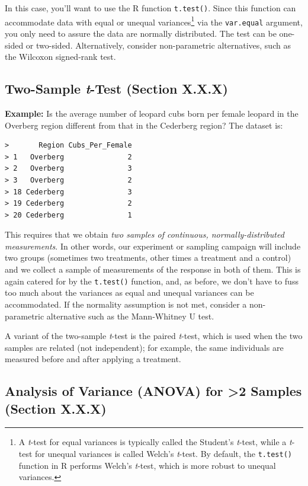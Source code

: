 \documentclass[
  letterpaper,
]{book}
\begin{document}
In this case, you'll want to use the R function \texttt{t.test()}. Since
this function can accommodate data with equal or unequal
variances\footnote{A \emph{t}-test for equal variances is typically
  called the Student's \emph{t}-test, while a \emph{t}-test for unequal
  variances is called Welch's \emph{t}-test. By default, the
  \texttt{t.test()} function in R performs Welch's \emph{t}-test, which
  is more robust to unequal variances.} via the \texttt{var.equal}
argument, you only need to assure the data are normally distributed. The
test can be one-sided or two-sided. Alternatively, consider
non-parametric alternatives, such as the Wilcoxon signed-rank test.

\subsection{\texorpdfstring{Two-Sample \emph{t}-Test (Section
X.X.X)}{Two-Sample t-Test (Section X.X.X)}}\label{two-sample-t-test-section-x.x.x}

\textbf{Example:} Is the average number of leopard cubs born per female
leopard in the Overberg region different from that in the Cederberg
region? The dataset is:

\begin{verbatim}
>       Region Cubs_Per_Female
> 1   Overberg               2
> 2   Overberg               3
> 3   Overberg               2
> 18 Cederberg               3
> 19 Cederberg               2
> 20 Cederberg               1
\end{verbatim}

This requires that we obtain \emph{two samples of continuous,
normally-distributed measurements}. In other words, our experiment or
sampling campaign will include two groups (sometimes two treatments,
other times a treatment and a control) and we collect a sample of
measurements of the response in both of them. This is again catered for
by the \texttt{t.test()} function, and, as before, we don't have to fuss
too much about the variances as equal and unequal variances can be
accommodated. If the normality assumption is not met, consider a
non-parametric alternative such as the Mann-Whitney U test.

A variant of the two-sample \emph{t}-test is the paired \emph{t}-test,
which is used when the two samples are related (not independent); for
example, the same individuals are measured before and after applying a
treatment.

\subsection{Analysis of Variance (ANOVA) for \textgreater2 Samples
(Section
X.X.X)}\label{analysis-of-variance-anova-for-2-samples-section-x.x.x}
\end{document}
